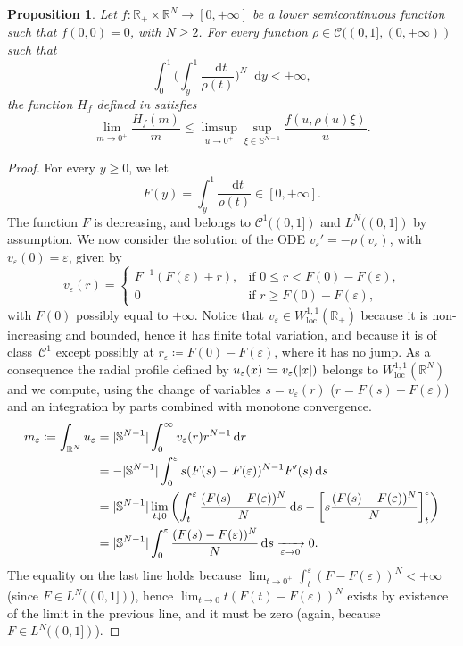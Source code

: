 \documentclass[JEP,XML,SOM,Unicode,published]{cedram}
\theoremstyle{plain}
\newtheorem{proposition}[theorem]{Proposition}
\theoremstyle{definition}
\newcommand{\dd}{\mathop{}\mathopen{}\mathrm{d}}
\newcommand{\R}{\mathbb{R}}
\newcommand{\Sph}{\mathbb{S}}
\newcommand{\Cspace}{\mathscr{C}}
\newcommand{\loc}{\mathrm{loc}}
\newcommand{\eps}{\varepsilon}
\DeclarePairedDelimiter{\abs}{\lvert}{\rvert}
\newcommand{\xto}[2][]{\xrightarrow[#2]{#1}}
\begin{document}
\begin{proposition}\label{slopeUpperBound}
Let $f:\R_+\times\R^N\to [0,+\infty]$ be a lower semicontinuous function such that $f(0,0)=0$, with $N\geq 2$. For every function \(\rho\in\Cspace((0,1],(0,+\infty))\) such that
\begin{equation}
\label{hypRegularityOriginSlope}
\int_0^1\Big(\int_y^1\frac{\dd t}{\rho(t)}\Big)^N\dd y<+\infty,
\end{equation}
the function $H_f$ defined in  satisfies
\begin{equation}
\label{slopeComparison}
\lim_{m\to 0^+}\frac{H_f(m)}{m}\leq\limsup_{u\to 0^+}\sup_{\xi\in\Sph^{N-1} }\frac{f(u,\rho(u)\xi)}{u}.
\end{equation}
\end{proposition}
\begin{proof}
For every $y\geq 0$, we let
\[
F(y)=\int_y^1\frac{\dd t}{\rho(t)} \in [0,+\infty].
\]
The function $F$ is decreasing, and belongs to $\Cspace^1((0,1])$ and \(L^N((0,1])\) by assumption. We now consider the solution of the ODE \(v_\eps'=-\rho(v_\eps)\), with \(v_\eps(0)=\eps\), given by
\[
v_\eps(r)=
\begin{cases}
F^{-1}(F(\eps)+r),&\text{if \(0\leq r<F(0)-F(\eps)\),}\\
0&\text{if \(r\geq F(0)-F(\eps)\)},
\end{cases}
\]
with $F(0)$ possibly equal to $+\infty$. Notice that $v_\eps \in W^{1,1}_\loc(\R_+)$ because it is non-increasing and bounded, hence it has finite total variation, and because it is of class~$\Cspace^1$ except possibly at $r_\eps \coloneqq F(0)-F(\eps)$, where it has no jump. As a consequence the radial profile defined by \(u_\eps(x)\coloneqq v_\eps(\abs{x})\) belongs to $W^{1,1}_\loc(\R^N)$ and we compute, using the change of variables \(s=v_\eps(r)\) (\ie \(r=F(s)-F(\eps)\)) and an integration by parts combined with monotone convergence.
\begin{align*}
m_\eps\coloneqq\int_{\R^N}u_\eps&=\abs{\Sph^{N-1}}\int_0^\infty v_\eps(r)r^{N-1}\dd r\\
&=-\abs{\Sph^{N-1}}\int_0^\eps s(F(s)-F(\eps))^{N-1}F'(s)\dd s\\
&=\abs{\Sph^{N-1}}\lim_{t\downarrow 0} \left(\int_t^\eps\frac{(F(s)-F(\eps))^N}{N}\dd s- \left[s\frac{(F(s)-F(\eps))^N}N\right]_t^\eps\right)\\
&=\abs{\Sph^{N-1}}\int_0^\eps\frac{(F(s)-F(\eps))^N}{N}\dd s\xto{\eps \to 0}0.
\end{align*}
The equality on the last line holds because $\lim_{t\to 0^+} \int_t^\eps (F-F(\eps))^N < +\infty$ (since $F \in L^N((0,1])$), hence $\lim_{t\to 0} t(F(t)-F(\eps))^N$ exists by existence of the limit in the previous line, and it must be zero (again, because $F \in L^N((0,1])$).


\end{proof}
\end{document}
